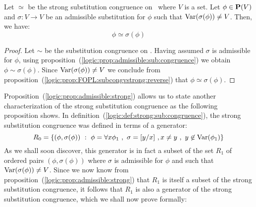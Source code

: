 \begin{prop}\label{logic:prop:admissible:strong}
Let $\simeq$ be the strong substitution congruence on \pv\ where $V$
is a set. Let $\phi\in\mbox{${\bf P}(V)$}$ and $\sigma:V\to V$ be an admissible
substitution for $\phi$ such that $\mbox{\rm Var}(\sigma(\phi))\neq V$. Then,
we have:
    \[
    \phi\simeq\sigma(\phi)
    \]
\end{prop}
\begin{proof}
Let $\sim$ be the substitution congruence on \pv. Having assumed
$\sigma$ is admissible for $\phi$, using
proposition~(\ref{logic:prop:admissible:sub:congruence}) we obtain
$\phi\sim\sigma(\phi)$. Since $\mbox{\rm Var}(\sigma(\phi))\neq V$ we conclude
from proposition~(\ref{logic:prop:FOPL:subcongvstrong:reverse}) that
$\phi\simeq\sigma(\phi)$.
\end{proof}

Proposition~(\ref{logic:prop:admissible:strong}) allows us to state
another characterization of the strong substitution congruence as
the following proposition shows. In
definition~(\ref{logic:def:strong:sub:congruence}), the strong
substitution congruence was defined in terms of a generator:
 \[
    R_{0}=\{(\phi,\sigma(\phi))\ :\ \phi=\forall x\phi_{1}\ ,\
    \sigma=[y/x]\ ,x\neq y\ , \ y\not\in\var(\phi_{1})\}
 \]
As we shall soon discover, this generator is in fact a subset of the
set $R_{1}$ of ordered pairs $(\phi,\sigma(\phi))$ where $\sigma$ is
admissible for $\phi$ and such that $\mbox{\rm Var}(\sigma(\phi))\neq V$.
Since we now know from
proposition~(\ref{logic:prop:admissible:strong}) that $R_{1}$ is
itself a subset of the strong substitution congruence, it follows
that $R_{1}$ is also a generator of the strong substitution
congruence, which we shall now prove formally:

